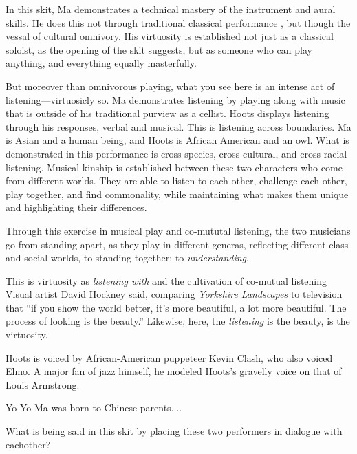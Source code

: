 \documentclass[12pt,letterpaper]{article}
\begin{document}
	In this skit, Ma demonstrates a technical mastery of the instrument and
	aural skills. He does this not through traditional classical performance
	, but though the vessal of cultural omnivory. His virtuosity is 
	established not just as a classical soloist, as the opening of the skit
	suggests, but as someone who can play anything, and everything equally 
	masterfully.

	But moreover than omnivorous playing, what you see here is an intense
	act of listening---virtuosicly so. Ma demonstrates listening by playing 
	along with music that is outside of his traditional purview as a 
	cellist. Hoots displays listening through his responses, verbal and 
	musical. This is listening across boundaries. Ma is Asian and a human 
	being, and Hoots is African American and an owl. What is demonstrated 
	in this performance is cross species, cross cultural, and cross racial 
	listening. Musical kinship is established between these two characters 
	who come from different worlds. They are able to listen to each other, 
	challenge each other, play together, and find commonality, while 
	maintaining what makes them unique and highlighting their differences. 

	Through this exercise in musical play and co-mututal listening, the two
	musicians go from standing apart, as they play in different generas, 
	reflecting different class and social worlds, to standing together: to 
	\textit{understanding}.
	
	This is virtuosity as \textit{listening with} and the cultivation of 
	co-mutual listening
	Visual artist David Hockney said, comparing \textit{Yorkshire 
	Landscapes} to television that ``if you show the world better, it's more
	beautiful, a lot more beautiful. The process of looking is the 
	beauty.''\autocite[100]{Odell} Likewise, here, the \textit{listening} is
	the beauty, is the virtuosity.  


	Hoots is voiced by 
	African-American puppeteer Kevin Clash, who also voiced Elmo. A major 
	fan of jazz himself, he modeled Hoots's gravelly voice on that of Louis 
	Armstrong.\autocite[41]{Clash} 

	Yo-Yo Ma was born to Chinese parents....

	What is being said in this skit by placing these two performers in 
	dialogue with eachother? 
	




\newpage
\singlespacing
\printbibliography
\end{document}
